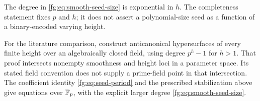 The degree in \eqref{fg:eq:smooth-seed-size} is exponential in $h$.
The completeness statement fixes $p$ and $h$; it does not assert a
polynomial-size seed as a function of a binary-encoded varying height.

For the literature comparison,
\citet[Convention~4.15 and Theorem~4.18, pp.~25--28]{fg-kty-two}
construct anticanonical hypersurfaces of every finite height over an
algebraically closed field, using degree $p^h-1$ for $h>1$.
That proof intersects nonempty smoothness and height loci in a
parameter space. Its stated field convention does not supply a
prime-field point in that intersection. The coefficient identity
\eqref{fg:eq:seed-period} and the prescribed stabilization above
give equations over $\mathbb F_p$, with the explicit larger degree
\eqref{fg:eq:smooth-seed-size}.
